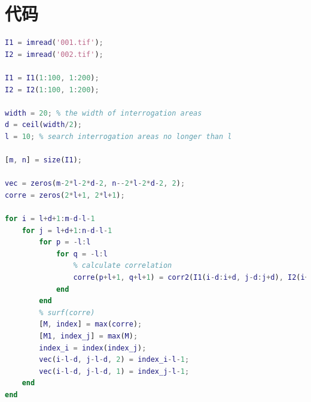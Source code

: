 \documentclass[12pt]{article}
\begin{document}
\section{代码}

\begin{lstlisting}[language=Matlab]
I1 = imread('001.tif');
I2 = imread('002.tif');

I1 = I1(1:100, 1:200);
I2 = I2(1:100, 1:200);

width = 20; % the width of interrogation areas
d = ceil(width/2);
l = 10; % search interrogation areas no longer than l

[m, n] = size(I1);

vec = zeros(m-2*l-2*d-2, n--2*l-2*d-2, 2);
corre = zeros(2*l+1, 2*l+1);

for i = l+d+1:m-d-l-1
	for j = l+d+1:n-d-l-1
		for p = -l:l
			for q = -l:l
				% calculate correlation
				corre(p+l+1, q+l+1) = corr2(I1(i-d:i+d, j-d:j+d), I2(i+p-d:i+p+d, j+q-d:j+q+d));
			end
		end
		% surf(corre)
		[M, index] = max(corre);
		[M1, index_j] = max(M);
		index_i = index(index_j);
		vec(i-l-d, j-l-d, 2) = index_i-l-1;
		vec(i-l-d, j-l-d, 1) = index_j-l-1;
	end
end
\end{lstlisting}



% 
\end{document}

